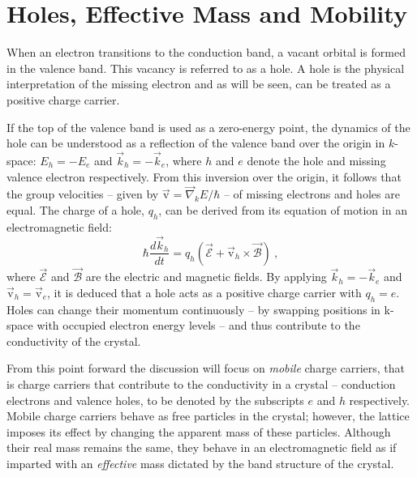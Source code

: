 \section{Holes, Effective Mass and Mobility}\label{sec:eff_mass}
When an electron transitions to the conduction band, a vacant orbital is formed in the valence band. This vacancy is referred to as a hole. A hole is the physical interpretation of the missing electron and as will be seen, can be treated as a positive charge carrier. 

If the top of the valence band is used as a zero-energy point, the dynamics of the hole can be understood as a reflection of the valence band over the origin in $k$-space: $E_h = -E_e$ and $\vec{k}_h = - \vec{k}_e$, where $h$ and $e$ denote the hole and missing valence electron respectively. From this inversion over the origin, it follows that the group velocities -- given by $\vec{\text{v}} = \vec{\nabla}_kE/\hbar$ -- of missing electrons and holes are equal. The charge of a hole, $q_h$, can be derived from its equation of motion in an electromagnetic field: 
\begin{equation}
	\hbar \frac{d\vec{k}_h}{dt} = q_h\left(\vec{\mathcal{E}} + \vec{\text{v}}_h\times\vec{\mathcal{B}}\right)~,
	\label{eq:em_force}
\end{equation}
where $\vec{\mathcal{E}}$ and $\vec{\mathcal{B}}$ are the electric and magnetic fields. By applying $\vec{k}_h = - \vec{k}_e$ and  $\vec{\text{v}}_h = \vec{\text{v}}_e$, it is deduced that a hole acts as a positive charge carrier with $q_h = e$. Holes can change their momentum continuously -- by swapping positions in k-space with occupied electron energy levels -- and thus contribute to the conductivity of the crystal. 

From this point forward the discussion will focus on \textit{mobile} charge carriers, that is charge carriers that contribute to the conductivity in a crystal -- conduction electrons and valence holes, to be denoted by the subscripts $e$ and $h$ respectively. Mobile charge carriers behave as free particles in the crystal; however, the lattice imposes its effect by changing the apparent mass of these particles. Although their real mass remains the same, they behave in an electromagnetic field as if imparted with an \textit{effective} mass dictated by the band structure of the crystal.
 
